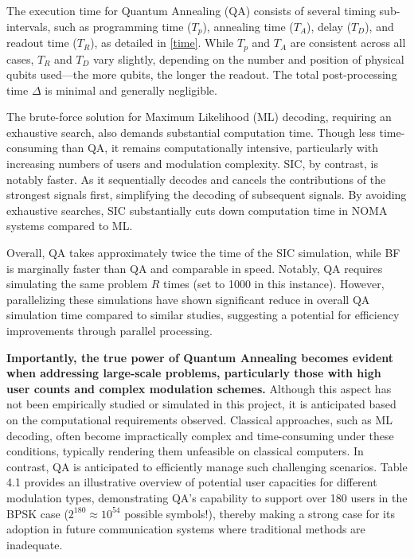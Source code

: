 The execution time for Quantum Annealing (QA) consists of several timing sub-intervals, such as programming time (\(T_p\)), annealing time (\(T_A\)), delay (\(T_D\)), and readout time (\(T_R\)), as detailed in \autoref{time}. While \(T_p\) and \(T_A\) are consistent across all cases, \(T_R\) and \(T_D\) vary slightly, depending on the number and position of physical qubits used—the more qubits, the longer the readout. The total post-processing time \(\Delta\) is minimal and generally negligible.

The brute-force solution for Maximum Likelihood (ML) decoding, requiring an exhaustive search, also demands substantial computation time. Though less time-consuming than QA, it remains computationally intensive, particularly with increasing numbers of users and modulation complexity.
SIC, by contrast, is notably faster. As it sequentially decodes and cancels the contributions of the strongest signals first, simplifying the decoding of subsequent signals. By avoiding exhaustive searches, SIC substantially cuts down computation time in NOMA systems compared to ML.

Overall, QA takes approximately twice the time of the SIC simulation, while BF is marginally faster than QA and comparable in speed. Notably, QA requires simulating the same problem \(R\) times (set to 1000 in this instance). However, parallelizing these simulations have shown significant reduce in overall QA simulation time compared to similar studies, suggesting a potential for efficiency improvements through parallel processing.

\textbf{Importantly, the true power of Quantum Annealing becomes evident when addressing large-scale problems, particularly those with high user counts and complex modulation schemes.} Although this aspect has not been empirically studied or simulated in this project, it is anticipated based on the computational requirements observed. Classical approaches, such as ML decoding, often become impractically complex and time-consuming under these conditions, typically rendering them unfeasible on classical computers. In contrast, QA is anticipated to efficiently manage such challenging scenarios. Table 4.1 provides an illustrative overview of potential user capacities for different modulation types, demonstrating QA's capability to support over 180 users in the BPSK case (\(2^{180} \approx 10^{54}\) possible symbols!), thereby making a strong case for its adoption in future communication systems where traditional methods are inadequate.





